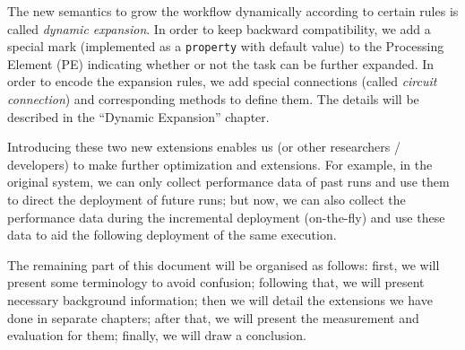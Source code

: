 The new semantics to grow the workflow dynamically according to certain rules is called \emph{dynamic expansion}. In order to keep backward compatibility, we add a special mark (implemented as a \lstinline|property| with default value) to the Processing Element (PE) indicating whether or not the task can be further expanded. In order to encode the expansion rules, we add special connections (called \emph{circuit connection}) and corresponding methods to define them. The details will be described in the ``Dynamic Expansion'' chapter.

Introducing these two new extensions enables us (or other researchers / developers) to make further optimization and extensions. For example, in the original \dpy system, we can only collect performance data of past runs and use them to direct the deployment of future runs; but now, we can also collect the performance data during the incremental deployment (\ie on-the-fly) and use these data to aid the following deployment of the same execution.

The remaining part of this document will be organised as follows: first, we will present some terminology to avoid confusion; following that, we will present necessary background information; then we will detail the extensions we have done in separate chapters; after that, we will present the measurement and evaluation for them; finally, we will draw a conclusion.
